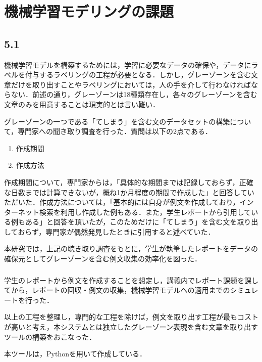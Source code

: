 \chapter{機械学習モデリングの課題 \label{c5}}

\section{5.1 \label{c5s1}}
機械学習モデルを構築するためには，学習に必要なデータの確保や，データにラベルを付与するラベリングの工程が必要となる．しかし，グレーゾーンを含む文章だけを取り出すことやラベリングにおいては，人の手を介して行わなければならない．前述の通り，グレーゾーンは18種類存在し，各々のグレーゾーンを含む文章のみを用意することは現実的とは言い難い．

グレーゾーンの一つである「てしまう」を含む文のデータセットの構築について，専門家への聞き取り調査を行った．質問は以下の2点である．

\begin{enumerate}
    \item 作成期間
    \item 作成方法
\end{enumerate}

作成期間について，専門家からは，「具体的な期間までは記録しておらず，正確な日数までは計算できないが，概ね1か月程度の期間で作成した」と回答していただいた．作成方法については，「基本的には自身が例文を作成しており，インターネット検索を利用し作成した例もある．また，学生レポートから引用している例もある」と回答を頂いたが，このためだけに「てしまう」を含む文を取り出しておらず，専門家が偶然発見したときに引用すると述べていた．

本研究では，上記の聴き取り調査をもとに，学生が執筆したレポートをデータの確保元としてグレーゾーンを含む例文収集の効率化を図った．

\subsection{}
学生のレポートから例文を作成することを想定し，講義内でレポート課題を課してから，レポートの回収・例文の収集，機械学習モデルへの適用までのシミュレートを行った．



以上の工程を整理し，専門的な工程を除けば，例文を取り出す工程が最もコストが高いと考え，本システムとは独立したグレーゾーン表現を含む文章を取り出すツールの構築をおこなった．


本ツールは，Pythonを用いて作成している．